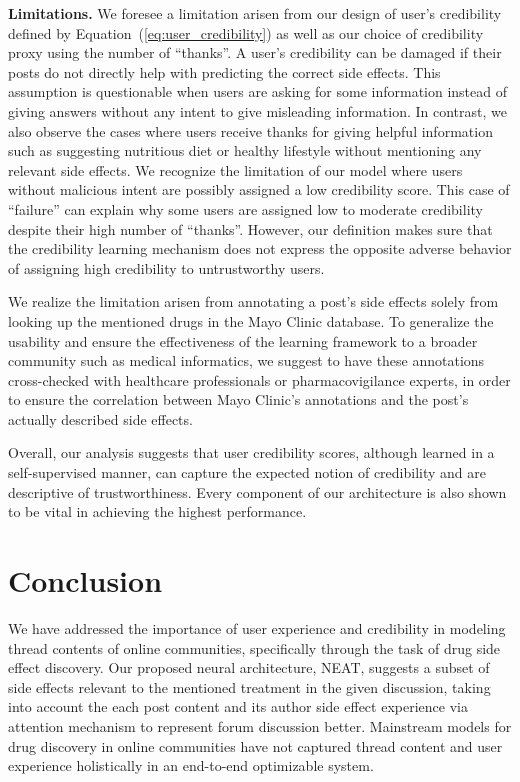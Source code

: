 \documentclass{bmcart}
\begin{document}
{\bf Limitations.} We foresee a limitation arisen from our design of user's credibility defined by Equation~(\ref{eq:user_credibility}) as well as our choice of credibility proxy using the number of ``thanks''. A user's credibility can be damaged if their posts do not directly help with predicting the correct side effects. 
This assumption is questionable when users are asking for some information instead of giving answers without any intent to give misleading information. 
In contrast, we also observe the cases where users receive thanks for giving helpful information such as suggesting nutritious diet or healthy lifestyle without mentioning any relevant side effects. We recognize the limitation of our model where users without malicious intent are possibly assigned a low credibility score. This case of ``failure'' can explain why some users are assigned low to moderate credibility despite their high number of ``thanks''. However, our definition makes sure that the credibility learning mechanism does not express the opposite adverse behavior of assigning high credibility to untrustworthy users.

We realize the limitation arisen from annotating a post's side effects solely from looking up the mentioned drugs in the Mayo Clinic database. To generalize the usability and ensure the effectiveness of the learning framework to a broader community such as medical informatics, we suggest to have these annotations cross-checked with healthcare professionals or pharmacovigilance experts, in order to ensure the correlation between Mayo Clinic's annotations and the post's actually described side effects.

Overall, our analysis suggests that user credibility scores, although learned in a self-supervised manner, can capture the expected notion of credibility and are descriptive of trustworthiness. Every component of our architecture is also shown to be vital in achieving the highest performance.

\section{Conclusion}\label{sec:conclusion}
We have addressed the importance of user experience and credibility in
modeling thread contents of online communities, specifically through
the task of drug side effect discovery. 
Our proposed neural architecture, NEAT, suggests a subset of side effects relevant to 
the mentioned treatment in the given discussion, 
taking into account the each post content and its
author side effect experience via attention mechanism to represent forum discussion better. Mainstream models for drug discovery in online communities have not captured thread content and user experience holistically in an end-to-end optimizable system.
\end{document}
